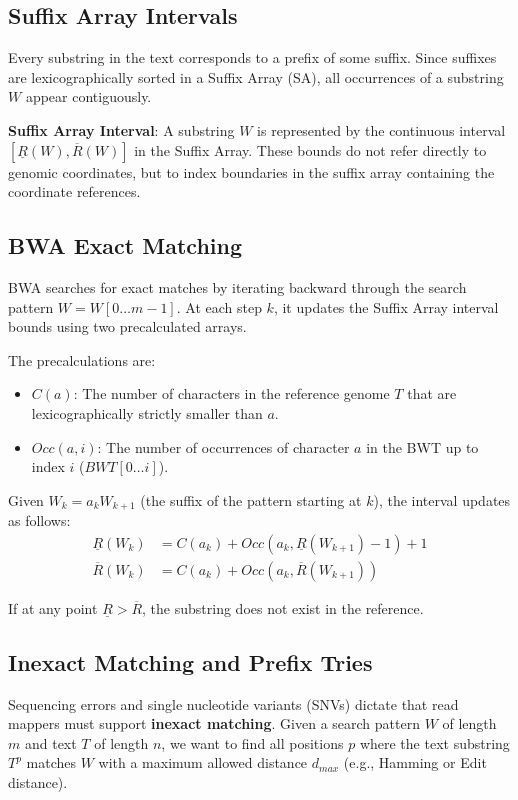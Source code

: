 \documentclass[11pt, a4paper]{article}
\newenvironment{important}{%
    \begin{tcolorbox}[colback=blue!5!white,colframe=blue!75!black,title=Important Concept]
}{%
    \end{tcolorbox}
}
\begin{document}
\subsection{Suffix Array Intervals}
Every substring in the text corresponds to a prefix of some suffix. Since suffixes are lexicographically sorted in a Suffix Array (SA), all occurrences of a substring $W$ appear contiguously.

\begin{important}
    \textbf{Suffix Array Interval}: A substring $W$ is represented by the continuous interval $[\underline{R}(W), \overline{R}(W)]$ in the Suffix Array. These bounds do not refer directly to genomic coordinates, but to index boundaries in the suffix array containing the coordinate references.
\end{important}

\subsection{BWA Exact Matching}
BWA searches for exact matches by iterating backward through the search pattern $W = W[0 \dots m-1]$. At each step $k$, it updates the Suffix Array interval bounds using two precalculated arrays.

The precalculations are:
\begin{itemize}
    \item $C(a)$: The number of characters in the reference genome $T$ that are lexicographically strictly smaller than $a$.
    \item $Occ(a, i)$: The number of occurrences of character $a$ in the BWT up to index $i$ ($BWT[0 \dots i]$).
\end{itemize}

Given $W_k = a_k W_{k+1}$ (the suffix of the pattern starting at $k$), the interval updates as follows:
\begin{align}
    \underline{R}(W_k) &= C(a_k) + Occ(a_k, \underline{R}(W_{k+1}) - 1) + 1 \label{eq:lower_bound} \\
    \overline{R}(W_k) &= C(a_k) + Occ(a_k, \overline{R}(W_{k+1})) \label{eq:upper_bound}
\end{align}

If at any point $\underline{R} > \overline{R}$, the substring does not exist in the reference.

\subsection{Inexact Matching and Prefix Tries}
Sequencing errors and single nucleotide variants (SNVs) dictate that read mappers must support \textbf{inexact matching}. Given a search pattern $W$ of length $m$ and text $T$ of length $n$, we want to find all positions $p$ where the text substring $T^p$ matches $W$ with a maximum allowed distance $d_{max}$ (e.g., Hamming or Edit distance).
\end{document}
